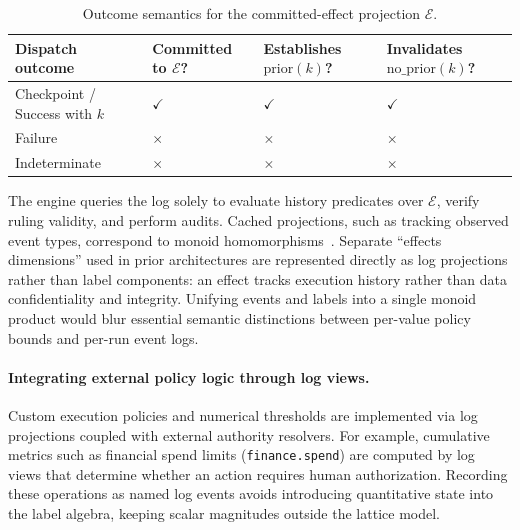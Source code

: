 \begin{table}[t]
\centering
\caption{Outcome semantics for the committed-effect projection $\mathcal{E}$.}
\label{tab:dispatch_outcomes}
\small
\renewcommand{\arraystretch}{1.15}
\begin{tabularx}{\columnwidth}{@{}l *{3}{>{\centering\arraybackslash}X} @{}}
\toprule
\textbf{Dispatch outcome} & \makecell[c]{\textbf{Committed}\\\textbf{to $\mathcal{E}$?}} & \makecell[c]{\textbf{Establishes}\\\textbf{$\mathrm{prior}(k)$?}} & \makecell[c]{\textbf{Invalidates}\\\textbf{$\mathrm{no\_prior}(k)$?}} \\
\midrule
Checkpoint / Success with $k$ & $\checkmark$ & $\checkmark$ & $\checkmark$ \\
Failure          & $\times$     & $\times$     & $\times$     \\
Indeterminate    & $\times$     & $\times$     & $\times$     \\
\bottomrule
\end{tabularx}
\end{table}

The engine queries the log solely to evaluate history predicates over $\mathcal{E}$, verify ruling validity, and perform audits. Cached projections, such as tracking observed event types, correspond to monoid homomorphisms~\cite{pierce2002types}. Separate ``effects dimensions'' used in prior architectures are represented directly as log projections rather than label components: an effect tracks execution history rather than data confidentiality and integrity. Unifying events and labels into a single monoid product would blur essential semantic distinctions between per-value policy bounds and per-run event logs.

\paragraph{Integrating external policy logic through log views.}
Custom execution policies and numerical thresholds are implemented via log projections coupled with external authority resolvers. For example, cumulative metrics such as financial spend limits (\texttt{finance.spend}) are computed by log views that determine whether an action requires human authorization. Recording these operations as named log events avoids introducing quantitative state into the label algebra, keeping scalar magnitudes outside the lattice model.


